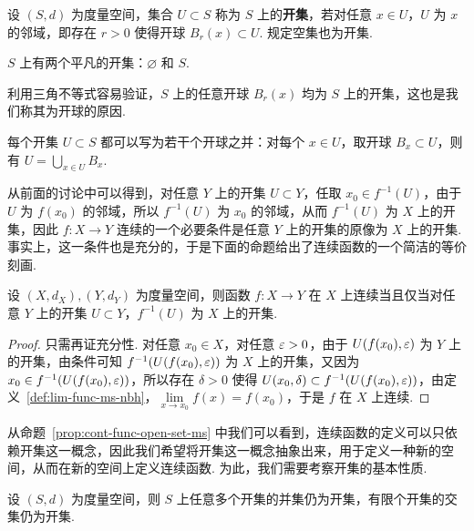 \documentclass[../main.tex]{subfiles}
\begin{document}
\begin{definition}[度量空间上开集的定义] \label{def:open-set-ms}
    设 $(S, d)$ 为度量空间，集合 $U \subset S$ 称为 $S$ 上的\textbf{开集}，若对任意 $x \in U$，$U$ 为 $x$ 的邻域，即存在 $r > 0$ 使得开球 $B_r(x) \subset U$. 规定空集也为开集. 
\end{definition}

\begin{remark}
    $S$ 上有两个平凡的开集：$\varnothing$ 和 $S$. 

    利用三角不等式容易验证，$S$ 上的任意开球 $B_r(x)$ 均为 $S$ 上的开集，这也是我们称其为开球的原因. 
    
    每个开集 $U \subset S$ 都可以写为若干个开球之并：对每个 $x \in U$，取开球 $B_x \subset U$，则有 $U = \bigcup\limits_{x \in U} B_x$. 
\end{remark}

从前面的讨论中可以得到，对任意 $Y$ 上的开集 $U \subset Y$，任取 $x_0 \in f^{-1}(U)$，由于 $U$ 为 $f(x_0)$ 的邻域，所以 $f^{-1}(U)$ 为 $x_0$ 的邻域，从而 $f^{-1}(U)$ 为 $X$ 上的开集，因此 $f:X \to Y$ 连续的一个必要条件是任意 $Y$ 上的开集的原像为 $X$ 上的开集. 事实上，这一条件也是充分的，于是下面的命题给出了连续函数的一个简洁的等价刻画. 

\begin{proposition}[度量空间上的连续函数的等价刻画] \label{prop:cont-func-open-set-ms}
    设 $(X, d_X), (Y, d_Y)$ 为度量空间，则函数 $f:X \to Y$ 在 $X$ 上连续当且仅当对任意 $Y$ 上的开集 $U \subset Y$，$f^{-1}(U)$ 为 $X$ 上的开集. 
\end{proposition}

\begin{proof}
    只需再证充分性. 对任意 $x_0 \in X$，对任意 $\varepsilon > 0$，由于 $U(f(x_0), \varepsilon)$ 为 $Y$ 上的开集，由条件可知 $f^{-1}(U(f(x_0), \varepsilon))$ 为 $X$ 上的开集，又因为 $x_0 \in f^{-1}(U(f(x_0), \varepsilon))$，所以存在 $\delta > 0$ 使得 $U(x_0, \delta) \subset f^{-1}(U(f(x_0), \varepsilon))$，由定义~\ref{def:lim-func-ms-nbh}，$\lim\limits_{x \to x_0} f(x) = f(x_0)$，于是 $f$ 在 $X$ 上连续. 
\end{proof}

从命题~\ref{prop:cont-func-open-set-ms} 中我们可以看到，连续函数的定义可以只依赖开集这一概念，因此我们希望将开集这一概念抽象出来，用于定义一种新的空间，从而在新的空间上定义连续函数. 为此，我们需要考察开集的基本性质. 

\begin{proposition}[度量空间上开集的性质]
    设 $(S, d)$ 为度量空间，则 $S$ 上任意多个开集的并集仍为开集，有限个开集的交集仍为开集. 
\end{proposition}
\end{document}
